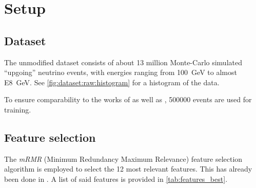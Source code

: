 \section{Setup}

\subsection{Dataset}
The unmodified dataset consists of about 13 million Monte-Carlo simulated \enquote{upgoing} neutrino events,
with energies ranging from \SI{100}{\giga\electronvolt} to almost \SI{E8}{\giga\electronvolt}.
See \autoref{fig:dataset:raw:histogram} for a histogram of the data.

To ensure comparability to the works of \citeauthor{dsea_samuel} as well as \citeauthor{dsea_jan},
\num{500000} events are used for training.


\subsection{Feature selection}
The \emph{mRMR} (Minimum Redundancy Maximum Relevance) feature selection algorithm \cite{mrmr} is employed to select the 12 most relevant features.
This has already been done in \cite{dsea_jan}.
A list of said features is provided in \autoref{tab:features_best}.

